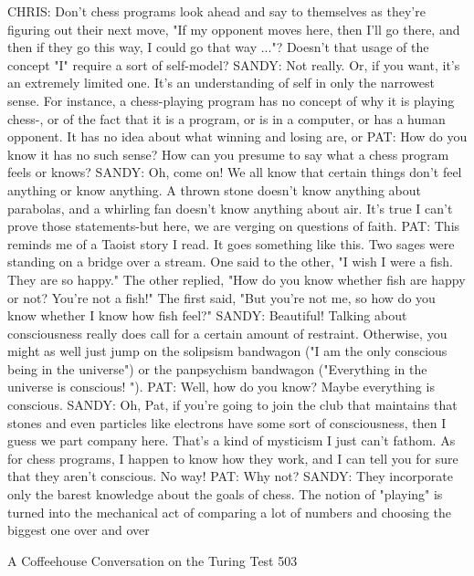 CHRIS: Don't chess programs look ahead and say to themselves as they're figuring
   out their next move, "If my opponent moves here, then I'll go there, and then if
   they go this way, I could go that way ..."? Doesn't that usage of the concept "I"
   require a sort of self-model?
SANDY: Not really. Or, if you want, it's an extremely limited one. It's an
   understanding of self in only the narrowest sense. For instance, a chess-playing
   program has no concept of why it is playing chess-, or of the fact that it is a
   program, or is in a computer, or has a human opponent. It has no idea about what
   winning and losing are, or
PAT: How do you know it has no such sense? How can you presume to say what a
   chess program feels or knows?
SANDY: Oh, come on! We all know that certain things don't feel anything or know
   anything. A thrown stone doesn't know anything about parabolas, and a whirling
   fan doesn't know anything about air. It's true I can't prove those statements-but
   here, we are verging on questions of faith.
PAT: This reminds me of a Taoist story I read. It goes something like this. Two sages
   were standing on a bridge over a stream. One said to the other, "I wish I were a
   fish. They are so happy." The other replied, "How do you know whether fish are
   happy or not? You're not a fish!" The first said, "But you're not me, so how do
   you know whether I know how fish feel?"
SANDY: Beautiful! Talking about consciousness really does call for a certain amount
   of restraint. Otherwise, you might as well just jump on the solipsism bandwagon
   ("I am the only conscious being in the universe") or the panpsychism bandwagon
   ("Everything in the universe is conscious! ").
PAT: Well, how do you know? Maybe everything is conscious.
SANDY: Oh, Pat, if you're going to join the club that maintains that stones and even
   particles like electrons have some sort of consciousness, then I guess we part
   company here. That's a kind of mysticism I just can't fathom. As for chess
   programs, I happen to know how they work, and I can tell you for sure that they
   aren't conscious. No way!
PAT: Why not?
SANDY: They incorporate only the barest knowledge about the goals of chess. The
   notion of "playing" is turned into the mechanical act of comparing a lot of
   numbers and choosing the biggest one over and over




A Coffeehouse Conversation on the Turing Test                                    503

